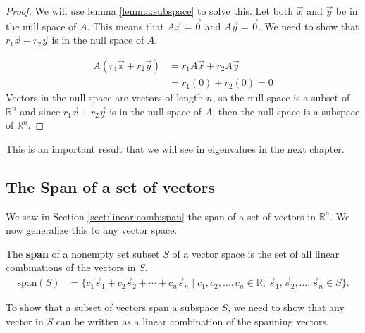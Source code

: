\begin{proof}

We will use lemma \ref{lemma:subspace} to solve this. Let both $\vec{x}$ and $\vec{y}$ be in the null space of $A$.  This means that $A\vec{x}=\vec{0}$ and $A\vec{y}=\vec{0}$.   We need to show that $r_1 \vec{x} + r_2 \vec{y}$ is in the null space of $A$. 


\begin{align*}
A(r_1 \vec{x} + r_2 \vec{y}) & = r_1 A\vec{x} + r_2 A\vec{y} \\
& = r_1 (0) + r_2 (0) = 0 
\end{align*}
Vectors in the null space are vectors of length $n$, so the null space is a subset of $\mathbb{R}^n$ and since  $r_1 \vec{x} + r_2 \vec{y}$ is in the null space of $A$, then the null space is a subspace of $\mathbb{R}^n$.  

\end{proof}

This is an important result that we will see in eigenvalues in the next chapter.  




\subsection{The Span of a set of vectors}


We saw in  Section \ref{sect:linear:comb:span} the span of a set of vectors in $\mathbb{R}^n$.  We now generalize this to any vector space.  

\begin{definition}
The \textbf{span} of a nonempty set subset $S$ of a vector space is the set of all linear combinations of the vectors in $S$.  
%
\begin{align*}
\text{span}(S) & = \{ c_1 \vec{s}_1 + c_2 \vec{s}_2 + \cdots + c_n \vec{s}_n\; | \; \text{$c_1, c_2, \ldots, c_n \in \mathbb{R}$, $\vec{s}_1, \vec{s}_2, \ldots, \vec{s}_n \in S$} \}.  
\end{align*}
\end{definition}

To show that a subset of vectors span a subspace $S$, we need to show that any vector in $S$ can be written as a linear combination of the spanning vectors.  

